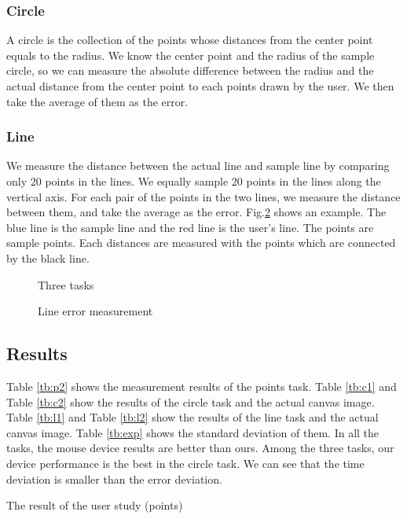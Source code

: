 \subsubsection{Circle}
A circle is the collection of the points whose distances from the center point equals to the radius.
We know the center point and the radius of the sample circle, so we can measure the absolute difference between the radius and the actual distance from the center point to each points drawn by the user. We then take the average of them as the error.
\subsubsection{Line}
We measure the distance between the actual line and sample line by comparing only 20 points in the lines. We equally sample 20 points in the lines along the vertical axis. For each pair of the points in the two lines, we measure the distance between them, and take the average as the error. 
Fig.\ref{linem} shows an example. The blue line is the sample line and the red line is the user's line. The points are sample points. Each distances are measured with the points which are connected by the black line.
\begin{figure}

 \caption{Three tasks}
 \label{task}
\end{figure}

\begin{figure}[htbp]
 \centering
 
 \caption{Line error measurement}
 \label{linem}
\end{figure}


\subsection{Results}
Table \ref{tb:p2} shows the measurement results of the points task. Table \ref{tb:c1} and Table \ref{tb:c2} show the results of the circle task and the actual canvas image. Table \ref{tb:l1} and Table \ref{tb:l2} show the results of the line task and the actual canvas image. Table \ref{tb:exp} shows the standard deviation of them. In all the tasks, the mouse device results are better than ours. Among the three tasks, our device performance is the best in the circle task. We can see that the time deviation is smaller than the error deviation.

\begin{table}[htbp]
 \centering
 \caption{The result of the user study (points)}
 \label{tb:p2}
 
\end{table}


